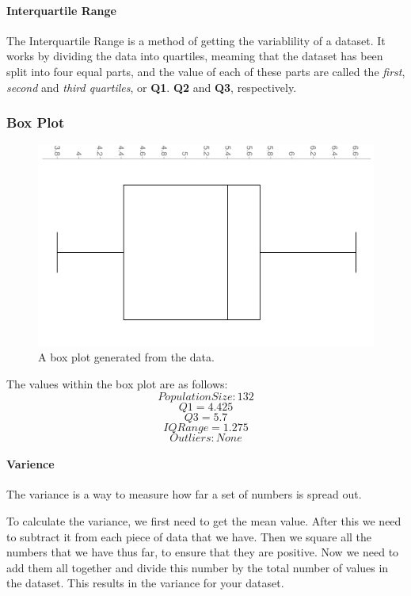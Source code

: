 \documentclass[a4paper,12pt]{article}
\begin{document}
      \paragraph{Interquartile Range}
        The Interquartile Range is a method of getting the variablility of a dataset. It works by dividing the data into quartiles, meaming that the dataset has been split into four equal parts, and the value of each of these parts are called the \textit{first}, \textit{second} and \textit{third quartiles}, or \textbf{Q1}. \textbf{Q2} and \textbf{Q3}, respectively.

  \newpage

  \subsubsection{Box Plot}
    \begin{figure}[h!]
      \includegraphics[width=\linewidth]{boxplot.jpg}
      \caption{A box plot generated from the data.}
      \label{fig:chart2}
    \end{figure}

    The values within the box plot are as follows:
    \[
      Population Size: 132
    \]
    \[
      Q1 = 4.425
    \]
    \[
      Q3 = 5.7
    \]
    \[
      IQ Range = 1.275
    \]
    \[
      Outliers: None
    \]

    \paragraph{Varience}
      The variance is a way to measure how far a set of numbers is spread out.

      To calculate the variance, we first need to get the mean value. After this we need to subtract it from each piece of data that we have. Then we square all the numbers that we have thus far, to ensure that they are positive. Now we need to add them all together and divide this number by the total number of values in the dataset. This results in the variance for your dataset.
\end{document}
